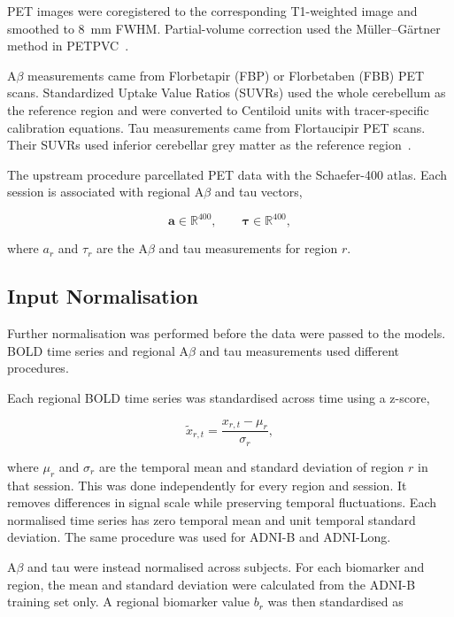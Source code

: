 PET images were coregistered to the corresponding T1-weighted image and
smoothed to 8~mm FWHM. Partial-volume correction used the
Müller--Gärtner method in PETPVC~\cite{Thomas2016}.

A$\beta$ measurements came from Florbetapir (FBP) or Florbetaben (FBB)
PET scans. Standardized Uptake Value Ratios (SUVRs) used the whole
cerebellum as the reference region and were converted to Centiloid
units with tracer-specific calibration equations. Tau measurements came
from Flortaucipir PET scans. Their SUVRs used inferior cerebellar grey
matter as the reference region~\cite{AquileLlorensMartinezMolina}.

The upstream procedure parcellated PET data with the Schaefer-400
atlas. Each session is associated with regional A$\beta$ and tau
vectors,

\begin{equation}
    \mathbf{a} \in \mathbb{R}^{400},
    \qquad
    \boldsymbol{\tau} \in \mathbb{R}^{400},
\end{equation}

where $a_r$ and $\tau_r$ are the A$\beta$ and tau measurements for
region $r$.


\subsection{Input Normalisation}
\label{sec:input_normalisation}

Further normalisation was performed before the data were passed to the
models. BOLD time series and regional A$\beta$ and tau measurements
used different procedures.

Each regional BOLD time series was standardised across time using a
z-score,

\begin{equation}
    \tilde{x}_{r,t}
    =
    \frac{x_{r,t}-\mu_r}{\sigma_r},
\end{equation}

where $\mu_r$ and $\sigma_r$ are the temporal mean and standard
deviation of region $r$ in that session. This was done independently
for every region and session. It removes differences in signal scale
while preserving temporal fluctuations. Each normalised time series has
zero temporal mean and unit temporal standard deviation. The same
procedure was used for ADNI-B and ADNI-Long.

A$\beta$ and tau were instead normalised across subjects. For each
biomarker and region, the mean and standard deviation were calculated
from the ADNI-B training set only. A regional biomarker value $b_r$ was
then standardised as

